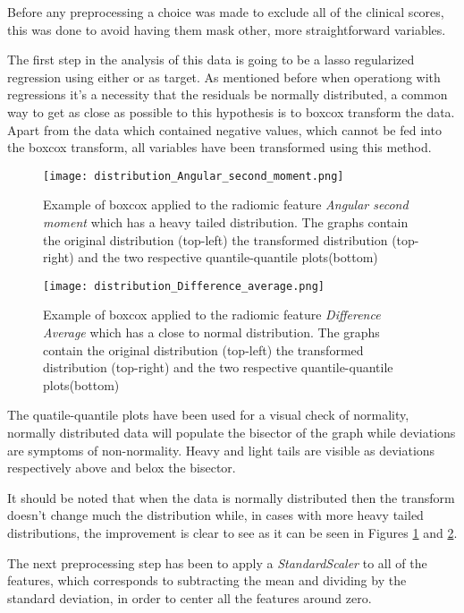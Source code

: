 Before any preprocessing a choice was made to exclude all of the clinical scores, this was done to avoid having them mask other, more straightforward variables.

The first step in the analysis of this data is going to be a lasso regularized regression using either \death or \icu as target. As mentioned before when operationg with regressions it's a necessity that the residuals be normally distributed, a common way to get as close as possible to this hypothesis is to boxcox transform the data. Apart from the data which contained negative values, which cannot be fed into the boxcox transform, all variables have been transformed using this method.

\begin{figure}[htbp]
  		\texttt{[image: distribution\_Angular\_second\_moment.png]}
        \caption{Example of boxcox applied to the radiomic feature \textit{Angular second moment} which has a heavy tailed distribution. The graphs contain the original distribution (top-left) the transformed distribution (top-right) and the two respective quantile-quantile plots(bottom) \label{fig:boxcox_example}}
\end{figure}

\begin{figure}[htbp]
  		\texttt{[image: distribution\_Difference\_average.png]}
        \caption{Example of boxcox applied to the radiomic feature \textit{Difference Average} which has a close to normal distribution. The graphs contain the original distribution (top-left) the transformed distribution (top-right) and the two respective quantile-quantile plots(bottom) \label{fig:boxcox_example_normal}}
\end{figure}

The quatile-quantile plots have been used for a visual check of normality, normally distributed data will populate the bisector of the graph while deviations are symptoms of non-normality. Heavy and light tails are visible as deviations respectively above and belox the bisector.

 It should be noted that when the data is normally distributed then the transform doesn't change much the distribution while, in cases with more heavy tailed distributions, the improvement is clear to see as it can be seen in Figures \ref{fig:boxcox_example} and \ref{fig:boxcox_example_normal}.

The next preprocessing step has been to apply a \textit{StandardScaler} to all of the features, which corresponds to subtracting the mean and dividing by the standard deviation, in order to center all the features around zero. 


